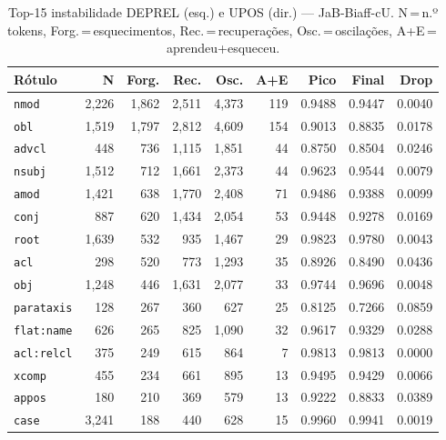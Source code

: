 

\begin{table}[ht]
\centering
\caption{Top-15 instabilidade DEPREL (esq.) e UPOS (dir.) --- JaB-Biaff-cU. N\,=\,n.º tokens, Forg.\,=\,esquecimentos, Rec.\,=\,recuperações, Osc.\,=\,oscilações, A+E\,=\,aprendeu+esqueceu.}
\label{tab:inst-predictions-results-jabuticabert-biaffine}
\begin{minipage}[t]{0.54\linewidth}
\centering\tiny
\begin{tabular}{lrrrrrrrr}
\toprule
\textbf{Rótulo} & \textbf{N} & \textbf{Forg.} & \textbf{Rec.} & \textbf{Osc.} & \textbf{A+E} & \textbf{Pico} & \textbf{Final} & \textbf{Drop} \\
\midrule
\texttt{nmod} & 2,226 & 1,862 & 2,511 & 4,373 & 119 & 0.9488 & 0.9447 & 0.0040 \\
\texttt{obl} & 1,519 & 1,797 & 2,812 & 4,609 & 154 & 0.9013 & 0.8835 & 0.0178 \\
\texttt{advcl} & 448 & 736 & 1,115 & 1,851 & 44 & 0.8750 & 0.8504 & 0.0246 \\
\texttt{nsubj} & 1,512 & 712 & 1,661 & 2,373 & 44 & 0.9623 & 0.9544 & 0.0079 \\
\texttt{amod} & 1,421 & 638 & 1,770 & 2,408 & 71 & 0.9486 & 0.9388 & 0.0099 \\
\texttt{conj} & 887 & 620 & 1,434 & 2,054 & 53 & 0.9448 & 0.9278 & 0.0169 \\
\texttt{root} & 1,639 & 532 & 935 & 1,467 & 29 & 0.9823 & 0.9780 & 0.0043 \\
\texttt{acl} & 298 & 520 & 773 & 1,293 & 35 & 0.8926 & 0.8490 & 0.0436 \\
\texttt{obj} & 1,248 & 446 & 1,631 & 2,077 & 33 & 0.9744 & 0.9696 & 0.0048 \\
\texttt{parataxis} & 128 & 267 & 360 & 627 & 25 & 0.8125 & 0.7266 & 0.0859 \\
\texttt{flat\!:\!name} & 626 & 265 & 825 & 1,090 & 32 & 0.9617 & 0.9329 & 0.0288 \\
\texttt{acl\!:\!relcl} & 375 & 249 & 615 & 864 & 7 & 0.9813 & 0.9813 & 0.0000 \\
\texttt{xcomp} & 455 & 234 & 661 & 895 & 13 & 0.9495 & 0.9429 & 0.0066 \\
\texttt{appos} & 180 & 210 & 369 & 579 & 13 & 0.9222 & 0.8833 & 0.0389 \\
\texttt{case} & 3,241 & 188 & 440 & 628 & 15 & 0.9960 & 0.9941 & 0.0019 \\
\bottomrule
\end{tabular}

\end{minipage}
\end{table}
